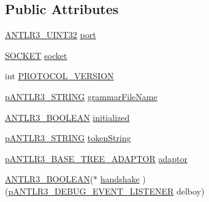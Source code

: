 \subsection*{Public Attributes}
\begin{DoxyCompactItemize}
\item 
\hyperlink{antlr3defs_8h_ac41f744abd0fd25144b9eb9d11b1dfd1}{A\-N\-T\-L\-R3\-\_\-\-U\-I\-N\-T32} \hyperlink{struct_a_n_t_l_r3___d_e_b_u_g___e_v_e_n_t___l_i_s_t_e_n_e_r__struct_a84ad67b6e7ee2d8c5cc50a92ef51d16a}{port}
\item 
\hyperlink{antlr3defs_8h_a8dc8083897335125630f1af5dafd5831}{S\-O\-C\-K\-E\-T} \hyperlink{struct_a_n_t_l_r3___d_e_b_u_g___e_v_e_n_t___l_i_s_t_e_n_e_r__struct_aed6e688364e4ff83067f57e436356a54}{socket}
\item 
int \hyperlink{struct_a_n_t_l_r3___d_e_b_u_g___e_v_e_n_t___l_i_s_t_e_n_e_r__struct_af15ca775d7e1dcb484542fdc30ed63a1}{P\-R\-O\-T\-O\-C\-O\-L\-\_\-\-V\-E\-R\-S\-I\-O\-N}
\item 
\hyperlink{antlr3interfaces_8h_a36bbe7362079348864db4b4dbdcce56b}{p\-A\-N\-T\-L\-R3\-\_\-\-S\-T\-R\-I\-N\-G} \hyperlink{struct_a_n_t_l_r3___d_e_b_u_g___e_v_e_n_t___l_i_s_t_e_n_e_r__struct_a4f01c6add4000cd36d700e22754e55a8}{grammar\-File\-Name}
\item 
\hyperlink{antlr3defs_8h_a5b33dccbba3b7212539695e21df4079b}{A\-N\-T\-L\-R3\-\_\-\-B\-O\-O\-L\-E\-A\-N} \hyperlink{struct_a_n_t_l_r3___d_e_b_u_g___e_v_e_n_t___l_i_s_t_e_n_e_r__struct_a72372c15b77044c33217002180102878}{initialized}
\item 
\hyperlink{antlr3interfaces_8h_a36bbe7362079348864db4b4dbdcce56b}{p\-A\-N\-T\-L\-R3\-\_\-\-S\-T\-R\-I\-N\-G} \hyperlink{struct_a_n_t_l_r3___d_e_b_u_g___e_v_e_n_t___l_i_s_t_e_n_e_r__struct_aa632f6a33c2a4a7471e2b76baa6264c3}{token\-String}
\item 
\hyperlink{antlr3interfaces_8h_aa6367527a5a2567bdc31c7066fc7000a}{p\-A\-N\-T\-L\-R3\-\_\-\-B\-A\-S\-E\-\_\-\-T\-R\-E\-E\-\_\-\-A\-D\-A\-P\-T\-O\-R} \hyperlink{struct_a_n_t_l_r3___d_e_b_u_g___e_v_e_n_t___l_i_s_t_e_n_e_r__struct_ad4f7a3ec200a922978922fb86fb72023}{adaptor}
\item 
\hyperlink{antlr3defs_8h_a5b33dccbba3b7212539695e21df4079b}{A\-N\-T\-L\-R3\-\_\-\-B\-O\-O\-L\-E\-A\-N}($\ast$ \hyperlink{struct_a_n_t_l_r3___d_e_b_u_g___e_v_e_n_t___l_i_s_t_e_n_e_r__struct_ae03e67490b74ee95bdd2a9e957022e15}{handshake} )(\hyperlink{antlr3interfaces_8h_ab226a624395fcc0b8fe2b29ae60b6116}{p\-A\-N\-T\-L\-R3\-\_\-\-D\-E\-B\-U\-G\-\_\-\-E\-V\-E\-N\-T\-\_\-\-L\-I\-S\-T\-E\-N\-E\-R} delboy)

\end{DoxyCompactItemize}
